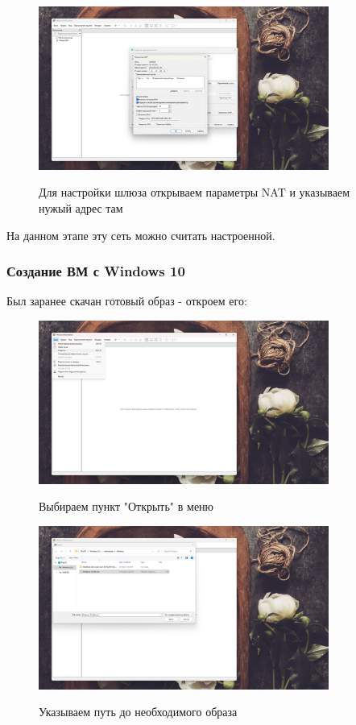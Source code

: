 \documentclass[a4paper]{article}
\begin{document}
  \begin{figure}[H]
    \centering
    \includegraphics[width=0.85\textwidth]{06_00 (6)}
    \label{img:6}
    \caption{Для настройки шлюза открываем параметры NAT и указываем нужый адрес там}
  \end{figure}

  На данном этапе эту сеть можно считать настроенной.

  \subsubsection{Создание ВМ с Windows 10}  

  Был заранее скачан готовый образ - откроем его:

  \begin{figure}[H]
    \centering
    \includegraphics[width=0.85\textwidth]{06_00 (7)}
    \label{img:7}
    \caption{Выбираем пункт "Открыть" в меню}
  \end{figure}
  
  \begin{figure}[H]
    \centering
    \includegraphics[width=0.85\textwidth]{06_00 (8)}
    \label{img:8}
    \caption{Указываем путь до необходимого образа}
  \end{figure}
  
\end{document}
